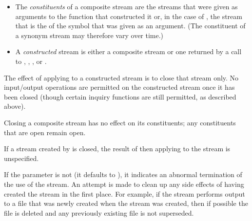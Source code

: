 \begin{defun}[Function]
\begin{new}
\begin{itemize}
\item
The \emph{constituents} of a composite stream are the streams that were given
as arguments to the function that constructed it or, in the case of
, the stream that is the  of
the symbol that was given as an argument.  (The constituent of
a synonym stream may therefore vary over time.)

\item
A \emph{constructed} stream is either a composite stream or one returned
by a call to , ,
, or
.
\end{itemize}

The effect of applying  to a constructed stream is to close
that stream only.  No input/output operations are permitted on the
constructed stream once it has been closed (though certain inquiry
functions are still permitted, as described above).

Closing a composite stream has no effect on its constituents;
any constituents that are open remain open.

If a stream created by  is closed,
the result of then applying  to the
stream is unspecified.
\end{new}

If the  parameter is not {\false} (it defaults to {\false}), it
indicates an abnormal termination of the use of the stream.  An attempt
is made to clean up any side effects of having created the stream in the
first place.  For example, if the stream performs output to a file
that was newly created when the stream was created, then if possible the
file is deleted and any previously existing file is not superseded.
\end{defun}

